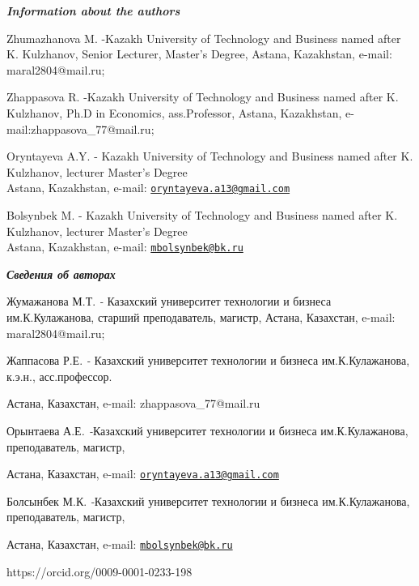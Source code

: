 \begin{authorinfo}
\emph{{\bfseries Information about the authors}}

Zhumazhanova M. -Kazakh University of Technology and Business named
after K. Kulzhanov, Senior Lecturer, Master's Degree, Astana,
Kazakhstan, e-mail: maral2804@mail.ru;

Zhappasova R. -Kazakh University of Technology and Business named after
K. Kulzhanov, Ph.D in Economics, ass.Professor, Astana, Kazakhstan,
e-mail:zhappasova\_77@mail.ru;

Oryntayeva A.Y. - Kazakh University of Technology and Business named
after K. Kulzhanov, lecturer Master's Degree\\
Astana, Kazakhstan, e-mail:
\href{mailto:oryntayeva.a13@gmail.com}{\nolinkurl{oryntayeva.a13@gmail.com}}

Bolsynbek M. - Kazakh University of Technology and Business named after
K. Kulzhanov, lecturer Master's Degree\\
Astana, Kazakhstan, e-mail:
\href{mailto:mbolsynbek@bk.ru}{\nolinkurl{mbolsynbek@bk.ru}}

\emph{{\bfseries Сведения об авторах}}

Жумажанова М.Т. \emph{-} Казахский университет технологии и бизнеса
им.К.Кулажанова, старший преподаватель, магистр, Астана, Казахстан,
e-mail: maral2804@mail.ru;

Жаппасова Р.Е. \emph{-} Казахский университет технологии и бизнеса
им.К.Кулажанова, к.э.н., асс.профессор.

Астана, Казахстан, e-mail: zhappasova\_77@mail.ru

Орынтаева А.Е\emph{. -}Казахский университет технологии и бизнеса
им.К.Кулажанова, преподаватель, магистр,

Астана, Казахстан, e-mail:
\href{mailto:oryntayeva.a13@gmail.com}{\nolinkurl{oryntayeva.a13@gmail.com}}

Болсынбек М.К. \emph{-}Казахский университет технологии и бизнеса
им.К.Кулажанова, преподаватель, магистр,

Астана, Казахстан, e-mail:
\href{mailto:mbolsynbek@bk.ru}{\nolinkurl{mbolsynbek@bk.ru}}

https://orcid.org/0009-0001-0233-198
\end{authorinfo}
